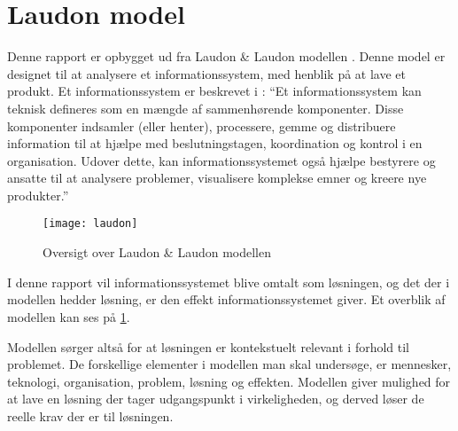 \section{Laudon model}
Denne rapport er opbygget ud fra Laudon \& Laudon modellen \cite{laudon}. Denne model er designet til at analysere et informationssystem, med henblik på at lave et produkt. Et informationssystem er beskrevet i \cite{laudon2006management}: \enquote{Et informationssystem kan teknisk defineres som en mængde af sammenhørende komponenter. Disse komponenter indsamler (eller henter), processere, gemme og distribuere information til at hjælpe med beslutningstagen, koordination og kontrol i en organisation. Udover dette, kan informationssystemet også hjælpe bestyrere og ansatte til at analysere problemer, visualisere komplekse emner og kreere nye produkter.}

\begin{figure}
	\begin{center}
		\texttt{[image: laudon]}
	\end{center}
	\caption{Oversigt over Laudon \& Laudon modellen}
	\label{fig:oversigt_laudon}
\end{figure}

I denne rapport vil informationssystemet blive omtalt som løsningen, og det der i modellen hedder løsning, er den effekt informationssystemet giver. Et overblik af modellen kan ses på \cref{fig:oversigt_laudon}. 

Modellen sørger altså for at løsningen er kontekstuelt relevant i forhold til problemet. De forskellige elementer i modellen man skal undersøge, er mennesker, teknologi, organisation, problem, løsning og effekten. Modellen giver mulighed for at lave en løsning der tager udgangspunkt i virkeligheden, og derved løser de reelle krav der er til løsningen.